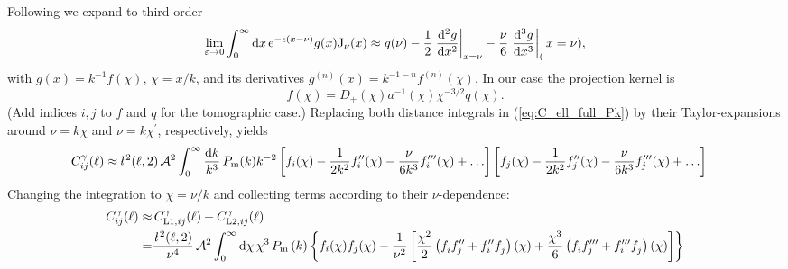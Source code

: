 \documentclass[useAMS,usenatbib]{mn2e} %
\newcommand{\ellbar}{\hbox{\it \l}\,}
\newcommand{\pref}{{\cal A}}
\begin{document}
Following \cite{2008PhRvD..78l3506L} we expand to third order
%
\begin{equation}
  \lim_{\varepsilon \rightarrow 0} \int_0^\infty {\rm d} x \, {\rm e}^{-\epsilon (x - \nu)} g(x) {\rm J}_\nu(x)
  \approx g(\nu) - \frac 1 2 \left.\frac{{\rm d}^2 g}{{\rm d} x^2}\right|_{x=\nu}
                 - \frac \nu 6 \left.\frac{{\rm d}^3 g}{{\rm d} x^3}\right|_(x=\nu) ,
\end{equation}
%
with $g(x) = k^{-1} f(\chi)$, $\chi=x/k$, and its derivatives $g^{(n)}(x) =
k^{-1-n} f^{(n)}(\chi)$. In our case the projection kernel is
%
\begin{equation}
  f(\chi) = D_+(\chi) a^{-1}(\chi) \chi^{-3/2} q(\chi).
  \label{eq:f_LA08}
\end{equation}
%
(Add indices $i, j$ to $f$ and $q$ for the tomographic case.)
%
Replacing both distance integrals in (\ref{eq:C_ell_full_Pk}) by their Taylor-expansions around $\nu = k \chi$ and $\nu = k \chi^\prime$,
respectively, yields
%
\begin{align}
  C^\gamma_{ij}(\ell) \approx & \, \ellbar^2(\ell, 2) \, \pref^2
    \int_0^\infty \frac{{\rm d} k}{k^3} \, P_{\rm m}(k) k^{-2}
    \left[ f_i(\chi) - \frac{1}{2 k^2} f_i^{\prime\prime}(\chi)
      - \frac{\nu}{6 k^3} f_i^{\prime\prime\prime}(\chi) + \ldots \right]
    \left[ f_j(\chi) - \frac{1}{2 k^2} f_j^{\prime\prime}(\chi)
    - \frac{\nu}{6 k^3} f_j^{\prime\prime\prime}(\chi) + \ldots \right]
  \label{eq:C_ell_limber2_dk}
\end{align}
%
Changing the integration to $\chi = \nu/k$ and collecting terms according to their $\nu$-dependence:
%
\begin{align}
  C^\gamma_{ij}(\ell) \approx & \, C^\gamma_{{\rm L1}, ij}(\ell) + C^\gamma_{{\rm L2}, ij}(\ell)
      \nonumber \\
    = & \frac{\ellbar^2(\ell, 2)}{\nu^4} \, \pref^2
    \int_0^\infty {\rm d} \chi \, \chi^3 \, P_{\rm m}\left( k \right)
    \left\{
    f_i(\chi) f_j(\chi)
     - \frac 1 {\nu^2} \left[ \frac{\chi^2}{2} \left( f^{}_i f^{\prime\prime}_j + f_i^{\prime\prime} f^{}_j \right)(\chi)
    + \frac{\chi^3}{6} \left( f^{}_i f^{\prime\prime\prime}_j + f^{\prime\prime\prime}_i f^{}_j \right)(\chi)
    \right]
    \right\}
  \label{eq:C_ell_limber12_dr}
\end{align}
\end{document}
